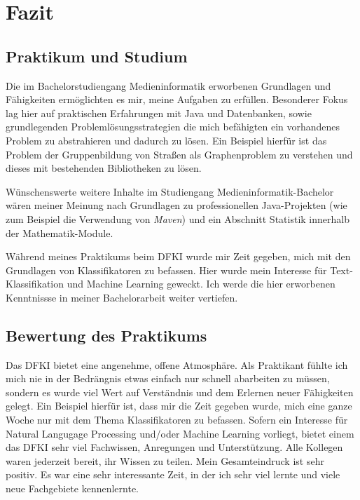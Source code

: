 \chapter{Fazit}
\section{Praktikum und Studium}
Die im Bachelorstudiengang Medieninformatik erworbenen Grundlagen und Fähigkeiten ermöglichten es mir, meine Aufgaben zu erfüllen.
Besonderer Fokus lag hier auf praktischen Erfahrungen mit Java und Datenbanken, sowie grundlegenden Problemlösungsstrategien die mich befähigten ein vorhandenes Problem zu abstrahieren und dadurch zu lösen.
Ein Beispiel hierfür ist das Problem der Gruppenbildung von Straßen als Graphenproblem zu verstehen und dieses mit bestehenden Bibliotheken zu lösen.

Wünschenswerte weitere Inhalte im Studiengang Medieninformatik-Bachelor wären meiner Meinung nach Grundlagen zu professionellen Java-Projekten (wie zum Beispiel die Verwendung von \textit{Maven}) und ein Abschnitt Statistik innerhalb der Mathematik-Module.

Während meines Praktikums beim DFKI wurde mir Zeit gegeben, mich mit den Grundlagen von Klassifikatoren zu befassen.
Hier wurde mein Interesse für Text-Klassifikation und Machine Learning geweckt.
Ich werde die hier erworbenen Kenntnissse in meiner Bachelorarbeit weiter vertiefen.

\section{Bewertung des Praktikums}

Das DFKI bietet eine angenehme, offene Atmosphäre.
Als Praktikant fühlte ich mich nie in der Bedrängnis etwas einfach nur schnell abarbeiten zu müssen, sondern es wurde viel Wert auf Verständnis und dem Erlernen neuer Fähigkeiten gelegt.
Ein Beispiel hierfür ist, dass mir die Zeit gegeben wurde, mich eine ganze Woche nur mit dem Thema Klassifikatoren zu befassen.
Sofern ein Interesse für Natural Langugage Processing und/oder Machine Learning vorliegt, bietet einem das DFKI sehr viel Fachwissen, Anregungen und Unterstützung.
Alle Kollegen waren jederzeit bereit, ihr Wissen zu teilen.
Mein Gesamteindruck ist sehr positiv.
Es war eine sehr interessante Zeit, in der ich sehr viel lernte und viele neue Fachgebiete kennenlernte.
